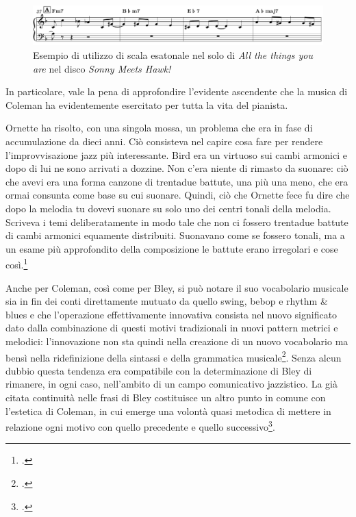 \begin{figure}[h]
	\centering
	\includegraphics[width=\linewidth]{screenshot001}
	\caption{Esempio di utilizzo di scala esatonale nel solo di \textit{All the things you are} nel disco \textit{Sonny Meets Hawk!}}
	\label{fig:screenshot001}
\end{figure}   
In particolare, vale la pena di approfondire l'evidente ascendente che la musica di Coleman ha evidentemente esercitato per tutta la vita del pianista.
\begin{fquote}
	Ornette ha risolto, con una singola mossa, un problema che era in fase di accumulazione da dieci anni. Ciò consisteva nel capire cosa fare per rendere l'improvvisazione jazz più interessante. Bird era un virtuoso sui cambi armonici e dopo di lui ne sono arrivati a dozzine. Non c'era niente di rimasto da suonare: ciò che avevi era una forma canzone di trentadue battute, una più una meno, che era ormai consunta come base su cui suonare. Quindi, ciò che Ornette fece fu dire che dopo la melodia tu dovevi suonare su solo uno dei centri tonali della melodia. Scriveva i temi deliberatamente in modo tale che non ci fossero trentadue battute di cambi armonici equamente distribuiti. Suonavano come se fossero tonali, ma a un esame più approfondito della composizione le battute erano irregolari e cose così.\footcite[12]{downbeat74}
\end{fquote}
Anche per Coleman, così come per Bley, si può notare il suo vocabolario musicale sia in fin dei conti direttamente mutuato da quello swing, bebop e rhythm \& blues e che l'operazione effettivamente innovativa consista nel nuovo significato dato dalla combinazione di questi motivi tradizionali in nuovi pattern metrici e melodici: l'innovazione non sta quindi nella creazione di un nuovo vocabolario ma bensì nella ridefinizione della sintassi e della grammatica musicale\footcite[109]{cogswell}. Senza alcun dubbio questa tendenza era compatibile con la determinazione di Bley di rimanere, in ogni caso, nell'ambito di un campo comunicativo jazzistico. La già citata continuità nelle frasi di Bley costituisce un altro punto in comune con l'estetica di Coleman, in cui emerge una volontà quasi metodica di mettere in relazione ogni motivo con quello precedente e quello successivo\footcite[115]{cogswell}.\par
